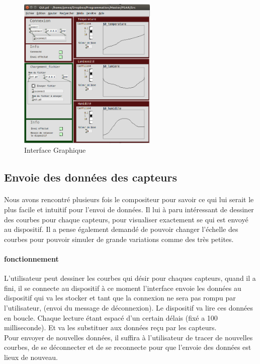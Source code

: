 \documentclass[a4paper, titlepage, oneside, 12pt]{article}%
\begin{document}
\begin{figure}[H]
	\centering
	\includegraphics[width=250px] {GUI.jpg}
	\caption{Interface Graphique}
\end{figure}
\subsection{Envoie des données des capteurs}
\paragraph{}
Nous avons rencontré plusieurs fois le compositeur pour savoir ce qui lui serait le plus facile et intuitif pour l'envoi de données. Il lui à paru intéressant de dessiner des courbes pour chaque capteurs, pour visualiser exactement se qui est envoyé au dispositif. Il a pense également demandé de pouvoir changer l'échelle des courbes pour pouvoir simuler de grande variations comme des très petites.\\

\paragraph{fonctionnement}
L'utilisateur peut dessiner les courbes qui désir pour chaques capteurs, quand il a fini, il se connecte au dispositif à ce moment l'interface envoie les données au dispositif qui va les stocker et tant que la connexion ne sera pas rompu par l'utilisateur, (envoi du message de déconnexion). Le dispositif va lire ces données en boucle. Chaque lecture étant espacé d'un certain délais (fixé a 100 milliseconde). Et va les substituer aux données reçu par les capteurs.\\
Pour envoyer de nouvelles données, il suffira à l'utilisateur de tracer de nouvelles courbes, de se déconnecter et de se reconnecte pour que l'envoie des données est lieux de nouveau.
\end{document}
